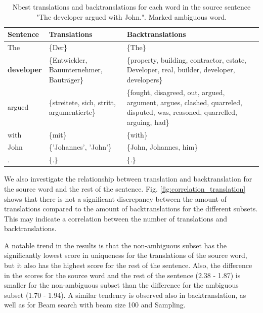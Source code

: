 \begin{table}[!htb]
    \centering
    \begin{tabularx}{\textwidth}{|l|X|X|}
        \hline
        \textbf{Sentence}  & \textbf{Translations} & \textbf{Backtranslations} \\ \hline
        The & \{Der\} & \{The\} \\ 
        \textbf{developer} & \{Entwickler, Bauunternehmer, Bauträger\} & \{property, building, contractor, estate, Developer, real, builder, developer, developers\} \\ 
        argued & \{streitete, sich, stritt, argumentierte\} & \{fought, disagreed, out, argued, argument, argues, clashed, quarreled, disputed, was, reasoned, quarrelled, arguing, had\} \\ 
        with & \{mit\} & \{with\} \\ 
        John & \{'Johannes', 'John'\} & \{John, Johannes, him\} \\ 
        . & \{.\} & \{.\} \\ \hline
    \end{tabularx}
    \caption[Nbest translations and backtranslations for each word in the source sentence "The developer argued with John."]{Nbest translations and backtranslations for each word in the source sentence "The developer argued with John.". Marked ambiguous word.}
    \label{tab:alignment_example}
\end{table}

We also investigate the relationship between translation and backtranslation for the source word and the rest of the sentence. Fig. \ref{fig:correlation_translation} shows that there is not a significant discrepancy between the amount of translations compared to the amount of backtranslations for the different subsets. This may indicate a correlation between the number of translations and backtranslations.

A notable trend in the results is that the non-ambiguous subset has the significantly lowest score in uniqueness for the translations of the source word, but it also has the highest score for the rest of the sentence. Also, the difference in the scores for the source word and the rest of the sentence (2.38 - 1.87) is smaller for the non-ambiguous subset than the difference for the ambiguous subset (1.70 - 1.94). A similar tendency is observed also in backtranslation, as well as for Beam search with beam size 100 and Sampling. 

